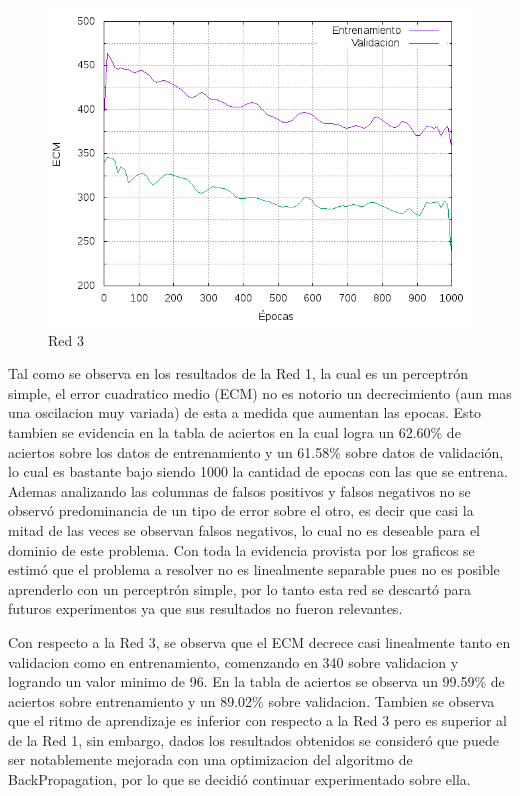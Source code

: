 \begin{figure}[H]
  \includegraphics[width=125mm]{imagenes/ej1/ex_1-1_red_11-6-6-9-1_errors.png}
  \caption{Red 3}
\end{figure}


 Tal como se observa en los resultados de la Red 1, la cual es un perceptrón simple, el error cuadratico medio (ECM) no es notorio un decrecimiento (aun mas una oscilacion
 muy variada) de esta a medida que aumentan las epocas.
 Esto tambien se evidencia en la tabla de aciertos en la cual logra un 62.60\% de aciertos sobre los datos de entrenamiento y un 61.58\% sobre datos de validación,
 lo cual es bastante bajo siendo 1000 la cantidad de epocas con las que se entrena. Ademas analizando las columnas de falsos positivos y falsos negativos no se observó
 predominancia de un tipo de error sobre el otro, es decir que casi la mitad de las veces se observan falsos negativos, lo cual no es deseable para el dominio de este problema.
 Con toda la evidencia provista por los graficos se estimó que el problema a resolver no es linealmente separable pues no es posible
 aprenderlo con un perceptrón simple, por lo tanto esta red se descartó para futuros experimentos ya que sus resultados no fueron relevantes.

 Con respecto a la Red 3, se observa que el ECM decrece casi linealmente tanto en validacion como en entrenamiento, comenzando en 340 sobre validacion y
 logrando un valor minimo de 96. En la tabla de aciertos se observa un 99.59\% de aciertos sobre entrenamiento y un 89.02\% sobre validacion. Tambien se observa
 que el ritmo de aprendizaje es inferior con respecto a la Red 3 pero es superior al de la Red 1, sin embargo, dados los resultados obtenidos se consideró
 que puede ser notablemente mejorada con una optimizacion del algoritmo de BackPropagation, por lo que se decidió continuar experimentado sobre ella.


